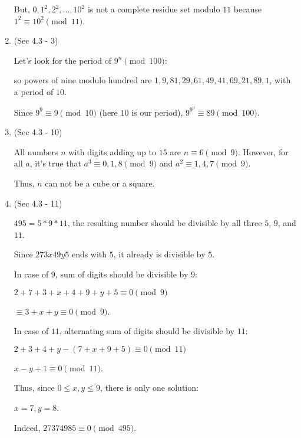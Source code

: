 \documentclass[12pt]{article}
\begin{document}
\begin{enumerate}
    But, $0, 1^2, 2^2, ..., 10^2$ is not a complete residue set modulo $11$ because $1^2 \equiv 10^2 \pmod {11}$.

  \item
    (Sec 4.3 - 3)

    Let's look for the period of $9^n \pmod {100}$:

    so powers of nine modulo hundred are $1, 9, 81, 29, 61, 49, 41, 69, 21, 89, 1$, with a period of $10$.

    Since $9^9 \equiv 9 \pmod {10}$ (here $10$ is our period), $9^{9^9} \equiv 89 \pmod {100}$.

  \item
    (Sec 4.3 - 10)

    All numbers $n$ with digits adding up to $15$ are $n \equiv 6 \pmod 9$. However,
    for all $a$, it's true that $a^3 \equiv 0, 1, 8 \pmod 9$ and $a^2 \equiv 1, 4, 7 \pmod 9$.

    Thus, $n$ can not be a cube or a square.

  \item
    (Sec 4.3 - 11)

    $495 = 5 * 9 * 11$, the resulting number should be divisible by all three $5$, $9$, and $11$.

    Since $273x49y5$ ends with $5$, it already is divisible by $5$.

    In case of $9$, sum of digits should be divisible by $9$:

    $2 + 7 + 3 + x + 4 + 9 + y + 5 \equiv 0 \pmod 9$

    $\equiv 3 + x + y \equiv 0 \pmod 9$.

    In case of $11$, alternating sum of digits should be divisible by $11$:

    $2 + 3 + 4 + y - (7 + x + 9 + 5) \equiv 0 \pmod {11}$

    $x - y + 1 \equiv 0 \pmod{11}$.

    Thus, since $0 \leq x, y \leq 9$, there is only one solution: 

    $x = 7, y = 8$.

    Indeed, $27374985 \equiv 0 \pmod{495}$.


\end{enumerate}
\end{document}
